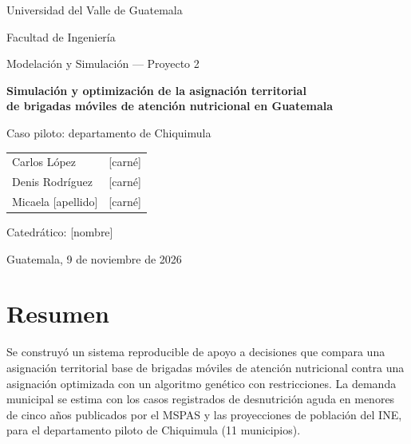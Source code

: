 \documentclass[11pt,letterpaper]{article}
\newcommand{\pend}[1]{\textcolor{red!70!black}{[#1]}}
\begin{document}
\begin{titlepage}
  \centering
  {\large Universidad del Valle de Guatemala \par}
  {\large Facultad de Ingeniería \par}
  \vspace{1.5cm}
  {\large Modelación y Simulación — Proyecto 2 \par}
  \vspace{2cm}
  {\LARGE\bfseries Simulación y optimización de la asignación territorial\\[4pt]
   de brigadas móviles de atención nutricional en Guatemala \par}
  \vspace{0.8cm}
  {\large Caso piloto: departamento de Chiquimula \par}
  \vspace{2.5cm}
  \begin{tabular}{ll}
    Carlos López & \pend{carné} \\
    Denis Rodríguez & \pend{carné} \\
    Micaela \pend{apellido} & \pend{carné} \\
  \end{tabular}
  \vfill
  {\large Catedrático: \pend{nombre} \par}
  \vspace{0.3cm}
  {\large Guatemala, 9 de noviembre de 2026 \par}
\end{titlepage}

\tableofcontents
\clearpage

\section*{Resumen}

Se construyó un sistema reproducible de apoyo a decisiones que compara una asignación territorial base de brigadas móviles de atención nutricional contra una asignación optimizada con un algoritmo genético con restricciones. La demanda municipal se estima con los casos registrados de desnutrición aguda en menores de cinco años publicados por el MSPAS y las proyecciones de población del INE, para el departamento piloto de Chiquimula (11 municipios).
\end{document}

